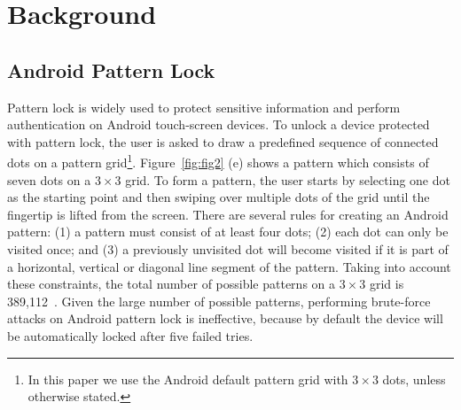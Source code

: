 %
%
%
%
%
%
%
%
%
%
\section{Background}
    \subsection{Android Pattern Lock}
        Pattern lock is widely used to protect sensitive information and perform authentication on
        Android touch-screen devices. To unlock a device protected with pattern lock, the user is asked to draw a predefined sequence of connected dots on a pattern grid\footnote{In this paper we use the Android default pattern grid with $3 \times 3$ dots, unless otherwise stated.}.
        Figure~\ref{fig:fig2} (e) shows a pattern which consists of seven dots on a $3 \times 3$ grid.
        To form a
        pattern, the user starts by selecting one dot as the
        starting point and then swiping over multiple dots of the grid until the fingertip is lifted from the screen.
        There are several rules for creating an Android pattern: (1) a pattern must consist
        of at least four dots; (2) each dot can only be visited once; and (3) a previously unvisited dot will
        become visited if it is part of a horizontal, vertical or diagonal
        line segment of the pattern. Taking into account these constraints, the total number of possible patterns
        on a $3\times3$ grid is 389,112~\cite{uellenbeck2013quantifying}.
        Given the large number of possible patterns, performing brute-force attacks on
        Android pattern lock is ineffective, because by default the device will be
        automatically locked after five failed tries.
        
